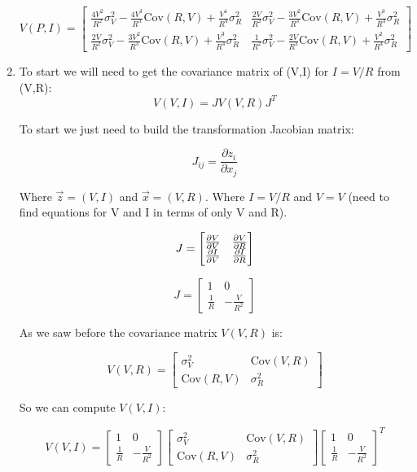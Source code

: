 \documentclass[10pt]{article}
\begin{document}
\begin{enumerate}[label=(\alph*)]
	      \[
		      \boxed{ V(P,I) =
			      \begin{bmatrix}
				      \frac{4V^2}{R^2}\sigma_V^2 - \frac{4V^3}{R^3}\text{Cov}(R,V) + \frac{V^4}{R^4}\sigma_R^2 & \frac{2V}{R^2}\sigma_V^2 - \frac{3V^2}{R^3}\text{Cov}(R,V) + \frac{V^3}{R^4}\sigma_R^2 \\
				      \frac{2V}{R^2}\sigma_V^2 - \frac{3V^2}{R^3}\text{Cov}(R,V)  + \frac{V^3}{R^4}\sigma_R^2  & \frac{1}{R^2}\sigma_V^2 - \frac{2V}{R^3}\text{Cov}(R,V) + \frac{V^2}{R^4}\sigma_R^2
			      \end{bmatrix} }
	      \]

	\item To start we will need to get the covariance matrix of (V,I) for $I=V/R$ from (V,R):
	      \[ V(V,I) = J V(V,R) J^T \]

	      To start we just need to build the transformation Jacobian matrix:

	      \[ J_{ij} = \frac{\partial z_i}{\partial x_j} \]

	      Where $\vec{z} = (V,I)$ and $\vec{x} = (V,R)$. Where $I = V/R$ and $V = V$ (need to find equations for V and I in terms of only V and R).

	      \[ J = \begin{bmatrix}
			      \pdv{V}{V} & \pdv{V}{R} \\
			      \pdv{I}{V} & \pdv{I}{R}
		      \end{bmatrix} \]

	      \[ J = \begin{bmatrix}
			      1           & 0              \\
			      \frac{1}{R} & -\frac{V}{R^2}
		      \end{bmatrix} \]




	      As we saw before the covariance matrix $V(V,R)$ is:

	      \[ V(V,R) = \begin{bmatrix}
			      \sigma_V^2      & \text{Cov}(V,R) \\
			      \text{Cov}(R,V) & \sigma_R^2
		      \end{bmatrix} \]

	      So we can compute $V(V,I)$:

	      \[ V(V,I) = \begin{bmatrix}
			      1           & 0              \\
			      \frac{1}{R} & -\frac{V}{R^2}
		      \end{bmatrix}\begin{bmatrix}
			      \sigma_V^2      & \text{Cov}(V,R) \\
			      \text{Cov}(R,V) & \sigma_R^2
		      \end{bmatrix} \begin{bmatrix}
			      1           & 0              \\
			      \frac{1}{R} & -\frac{V}{R^2}
		      \end{bmatrix}^T \]



\end{enumerate}
\end{document}
